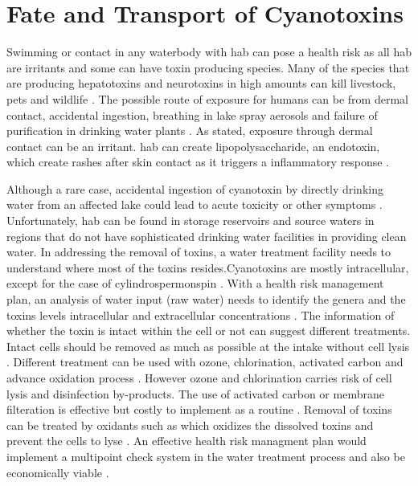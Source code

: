 \clearpage

\section{Fate and Transport of Cyanotoxins}
Swimming or contact in any waterbody with \gls{hab} can pose a health risk as all \gls{hab} are irritants and some can have toxin producing species. Many of the species that are producing hepatotoxins and neurotoxins in high amounts can kill livestock, pets and wildlife \cite{anderson_harmful_2002}. The possible route of exposure  for humans can be from dermal contact, accidental ingestion, breathing in lake spray aerosols and failure of purification in drinking water plants \cite{may_aerosol_2018,codd_cyanobacterial_1999}. As stated, exposure through dermal contact can be an irritant. \gls{hab} can create lipopolysaccharide, an endotoxin, which create rashes after skin contact as it triggers a inflammatory response \cite{ moore_richard_cyanobacterial_1993}.

Although a rare case, accidental ingestion of cyanotoxin by directly drinking water from an affected lake could  lead to acute toxicity or other symptoms \cite{monks_potent_2007}. Unfortunately, \gls{hab} can be found in storage reservoirs and source waters in regions that do not have sophisticated drinking water facilities in providing clean water. In addressing the removal of toxins, a water treatment facility needs to understand where most of the toxins resides.Cyanotoxins are mostly intracellular, except for the case of cylindrospermonspin \cite{rastogi_cyanotoxin-microcystins:_2014}.
 With a health risk management plan, an analysis of water input (raw water) needs to identify the genera and the toxins levels intracellular and extracellular concentrations \cite{saoudi_management_2017}. The information of whether the toxin is intact within the cell or not can suggest different treatments. Intact cells should be removed as much as possible at the intake without cell lysis \cite{westrick_review_2010}. Different treatment can be used with ozone, chlorination, activated carbon and advance oxidation process \cite{koreiviene_cyanotoxin_2014, westrick_cyanotoxin_2018}. However ozone and chlorination carries risk of cell lysis and disinfection by-products. The use of activated carbon or membrane filteration is effective but costly to implement as a routine \cite{koreiviene_cyanotoxin_2014}. Removal of toxins can be treated by oxidants such as  which oxidizes the dissolved toxins and prevent the cells to lyse \cite{westrick_cyanotoxin_2018}. An effective health risk managment plan would implement a multipoint check system in the water treatment process and also be economically viable \cite{westrick_review_2010,saoudi_management_2017}.

